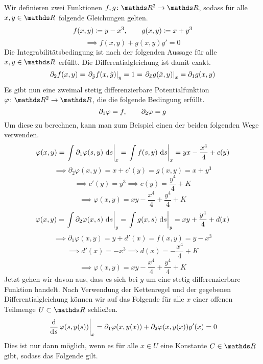 \begin{atiSolution}
  \begin{atiSubtaskSolutions}
    \item[\localref{a}]{
      \begin{atiSubtaskSolutions}
        \item[\localref{ai}]{
          Wir definieren zwei Funktionen $\func{f,g}{\setR^2}{\setR}$, sodass für alle $x,y\in\setR$ folgende Gleichungen gelten.
          \[
            f(x,y)\coloneqq y-x^3,\qquad g(x,y)\coloneqq x+y^3
          \]
          \[
            \implies f(x,y) + g(x,y)y' = 0
          \]
          Die Integrabilitätsbedingung ist nach der folgenden Aussage für alle $x,y\in\setR$ erfüllt.
          Die Differentialgleichung ist damit exakt.
          \[
            \partial_2f(x,y) = \left.\partial_{\tilde{y}} f(x,\tilde{y})\right\vert_{y}^{} = 1 = \left.\partial_{\tilde{x}} g(\tilde{x},y)\right\vert_{x}^{} = \partial_1g(x,y)
          \]
          Es gibt nun eine zweimal stetig differenzierbare Potentialfunktion $\func{\varphi}{\setR^2}{\setR}$, die die folgende Bedingung erfüllt.
          \[
            \partial_1\varphi = f ,\qquad \partial_2\varphi = g
          \]
          Um diese zu berechnen, kann man zum Beispiel einen der beiden folgenden Wege verwenden.
          \[
            \varphi(x,y) = \left.\int \partial_1\varphi(s,y)\ \mathrm{d} s\right\vert_{x}^{} = \left.\int f(s,y)\ \mathrm{d} s\right\vert_{x}^{} = yx - \frac{x^4}{4} + c(y)
          \]
          \[
            \implies \partial_2\varphi(x,y) = x + c'(y) = g(x,y) = x + y^3
          \]
          \[
            \implies c'(y) = y^3 \implies c(y) = \frac{y^4}{4} + K
          \]
          \[
            \implies \varphi(x,y) = xy - \frac{x^4}{4} + \frac{y^4}{4} + K
          \]
          \[
            \varphi(x,y) = \left.\int \partial_2\varphi(x,s)\ \mathrm{d} s\right\vert_{y}^{} = \left.\int g(x,s)\ \mathrm{d} s\right\vert_{y}^{} = xy + \frac{y^4}{4} + d(x)
          \]
          \[
            \implies \partial_1\varphi(x,y) = y + d'(x) = f(x,y) = y - x^3
          \]
          \[
            \implies d'(x) = -x^3 \implies d(x) = -\frac{x^4}{4} + K
          \]
          \[
            \implies \varphi(x,y) = xy - \frac{x^4}{4} + \frac{y^4}{4} + K
          \]
          Jetzt gehen wir davon aus, dass es sich bei $y$ um eine stetig differenzierbare Funktion handelt.
          Nach Verwendung der Kettenregel und der gegebenen Differentialgleichung können wir auf das Folgende für alle $x$ einer offenen Teilmenge $U\subset\setR$ schließen.
          \[
            \left.\frac{\mathrm{d} }{\mathrm{d} s}\,\varphi(s,y(s))\right\vert_{x}^{} = \partial_1\varphi(x,y(x)) + \partial_2\varphi(x,y(x)) y'(x) = 0
          \]
          Dies ist nur dann möglich, wenn es für alle $x\in U$ eine Konstante $C\in\setR$ gibt, sodass das Folgende gilt.
}
\end{atiSubtaskSolutions}}
\end{atiSubtaskSolutions}
\end{atiSolution}
